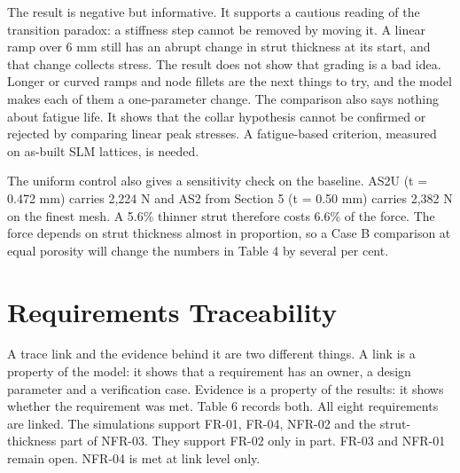 \documentclass[10pt,twocolumn,letterpaper]{article}
\begin{document}
The result is negative but informative. It supports a cautious reading of the transition paradox: a stiffness step cannot be removed by moving it. A linear ramp over 6 mm still has an abrupt change in strut thickness at its start, and that change collects stress. The result does not show that grading is a bad idea. Longer or curved ramps and node fillets are the next things to try, and the model makes each of them a one-parameter change. The comparison also says nothing about fatigue life. It shows that the collar hypothesis cannot be confirmed or rejected by comparing linear peak stresses. A fatigue-based criterion, measured on as-built SLM lattices, is needed.

The uniform control also gives a sensitivity check on the baseline. AS2U (t = 0.472 mm) carries 2,224 N and AS2 from Section 5 (t = 0.50 mm) carries 2,382 N on the finest mesh. A 5.6\% thinner strut therefore costs 6.6\% of the force. The force depends on strut thickness almost in proportion, so a Case B comparison at equal porosity will change the numbers in Table 4 by several per cent.


\section{Requirements Traceability}
A trace link and the evidence behind it are two different things. A link is a property of the model: it shows that a requirement has an owner, a design parameter and a verification case. Evidence is a property of the results: it shows whether the requirement was met. Table 6 records both. All eight requirements are linked. The simulations support FR-01, FR-04, NFR-02 and the strut-thickness part of NFR-03. They support FR-02 only in part. FR-03 and NFR-01 remain open. NFR-04 is met at link level only.
\end{document}
